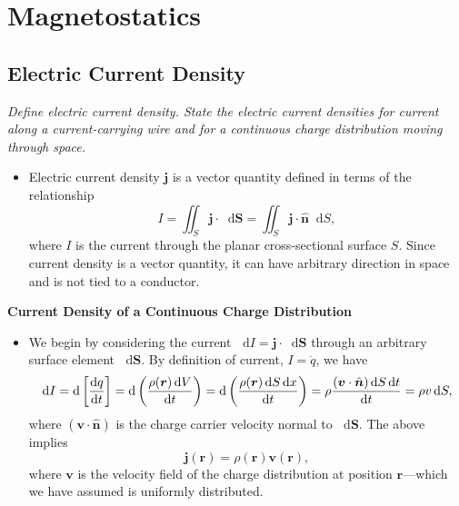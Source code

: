 \documentclass[11pt, a4paper]{article}
\newcommand{\diff}{\mathop{}\!\mathrm{d}} %
\renewcommand{\vec}[1]{\bm{#1}} %
\newcommand{\uvec}[1]{\hat{\vec{#1}}} %
\renewcommand{\r}{\vec{r}}
\renewcommand{\j}{\vec{j}}  %
\begin{document}
\newpage

\section{Magnetostatics}

\subsection{Electric Current Density}
\textit{Define electric current density. State the electric current densities for current along a current-carrying wire and for a continuous charge distribution moving through space.}

\begin{itemize}
	
    \item Electric current density $ \j $ is a vector quantity defined in terms of the relationship
	\begin{equation*}
		I = \iint_{S} \vec{j} \cdot \diff \vec{S} = \iint_{S} \vec{j} \cdot \uvec{n} \diff S,
	\end{equation*}
    where $ I $ is the current through the planar cross-sectional surface $ S $. Since current density is a vector quantity, it can have arbitrary direction in space and is not tied to a conductor. 
	
\end{itemize}

\textbf{Current Density of a Continuous Charge Distribution}
\begin{itemize}
    \item We begin by considering the current $ \diff I = \j \cdot \diff \vec{S} $ through an arbitrary surface element $ \diff \vec{S} $. By definition of current, $ I = \dot{q} $, we have
	\begin{equation*}
		\diff I = \diff \left[\dv{q}{t}\right] = \diff \left(\frac{\rho(\r)\diff V}{\diff t}\right) = \diff \left(\frac{\rho(\r)\diff S \diff x}{\diff t}\right)  = \rho \frac{(\vec{v} \cdot \uvec{n}) \diff S \diff t}{\diff t} = \rho v \diff S,
	\end{equation*}
	where $ (\vec{v} \cdot \uvec{n}) $ is the charge carrier velocity normal to $ \diff \vec{S} $. The above implies
	\begin{equation*}
		\vec{j}(\r) = \rho(\r) \vec{v}(\r),
	\end{equation*}
	where $ \vec{v} $ is the velocity field of the charge distribution at position $ \r $---which we have assumed is uniformly distributed.
\end{itemize}
	
\end{document}
